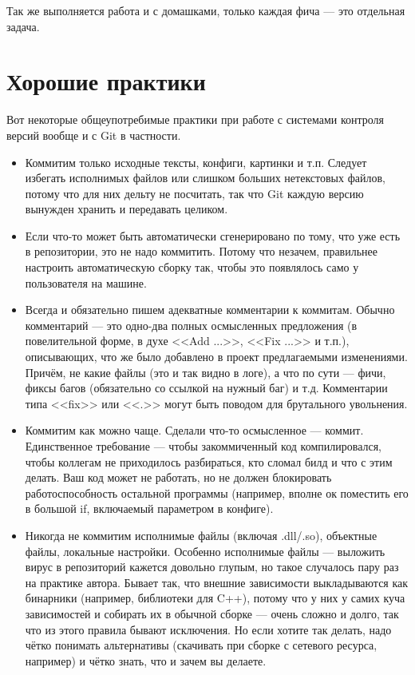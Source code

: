 \documentclass{../text-style}
\begin{document}
Так же выполняется работа и с домашками, только каждая фича --- это отдельная задача.

\section{Хорошие практики}

Вот некоторые общеупотребимые практики при работе с системами контроля версий вообще и с Git в частности.

\begin{itemize}
    \item Коммитим только исходные тексты, конфиги, картинки и т.п. Следует избегать исполнимых файлов или слишком больших нетекстовых файлов, потому что для них дельту не посчитать, так что Git каждую версию вынужден хранить и передавать целиком.
    \item Если что-то может быть автоматически сгенерировано по тому, что уже есть в репозитории, это не надо коммитить. Потому что незачем, правильнее настроить автоматическую сборку так, чтобы это появлялось само у пользователя на машине.
    \item Всегда и обязательно пишем адекватные комментарии к коммитам. Обычно комментарий --- это одно-два полных осмысленных предложения (в повелительной форме, в духе <<Add ...>>, <<Fix ...>> и т.п.), описывающих, что же было добавлено в проект предлагаемыми изменениями. Причём, не какие файлы (это и так видно в логе), а что по сути --- фичи, фиксы багов (обязательно со ссылкой на нужный баг) и т.д. Комментарии типа <<fix>> или <<.>> могут быть поводом для брутального увольнения.
    \item Коммитим как можно чаще. Сделали что-то осмысленное --- коммит. Единственное требование --- чтобы закоммиченный код компилировался, чтобы коллегам не приходилось разбираться, кто сломал билд и что с этим делать. Ваш код может не работать, но не должен блокировать работоспособность остальной программы (например, вполне ок поместить его в большой if, включаемый параметром в конфиге).
    \item Никогда не коммитим исполнимые файлы (включая .dll/.so), объектные файлы, локальные настройки. Особенно исполнимые файлы --- выложить вирус в репозиторий кажется довольно глупым, но такое случалось пару раз на практике автора. Бывает так, что внешние зависимости выкладываются как бинарники (например, библиотеки для C++), потому что у них у самих куча зависимостей и собирать их в обычной сборке --- очень сложно и долго, так что из этого правила бывают исключения. Но если хотите так делать, надо чётко понимать альтернативы (скачивать при сборке с сетевого ресурса, например) и чётко знать, что и зачем вы делаете.

\end{itemize}
\end{document}
